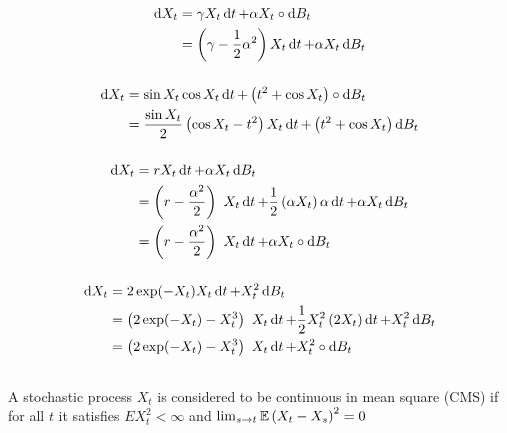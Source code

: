 \documentclass{article}
\begin{document}
        \subsubsection{}
        \begin{align*}
          \mathop{\mathrm{d} X_t }
          &=\gamma X_t\mathop{\mathrm{d} t }+\alpha X_t\circ\mathop{\mathrm{d} B_t }\\
          &=\left({\gamma-\frac{1}{2}\alpha^2}\right) X_t\mathop{\mathrm{d} t }+\alpha X_t\mathop{\mathrm{d} B_t }
          \end{align*}
        \subsubsection{}
        \begin{align*}
          \mathop{\mathrm{d} X_t }
          &=\sin X_t \cos X_t \mathop{\mathrm{d} t }+\left({t^2+\cos X_t}\right)\circ\mathop{\mathrm{d} B_t }\\
          &=\frac{\sin X_t}{2}\left({\cos X_t-t^2}\right) X_t\mathop{\mathrm{d} t }+\left({t^2+\cos X_t}\right)\mathop{\mathrm{d} B_t }
          \end{align*}
        \subsubsection{}
        \begin{align*}
          \mathop{\mathrm{d} X_t }
          &=r X_t\mathop{\mathrm{d} t }+\alpha X_t\mathop{\mathrm{d} B_t }\\
          &=\left({r-\frac{\alpha^2}{2}}\right)\ X_t\mathop{\mathrm{d} t } + \frac{1}{2}\left({\alpha X_t}\right)\alpha\mathop{\mathrm{d} t } +\alpha X_t\mathop{\mathrm{d} B_t }\\
          &=\left({r-\frac{\alpha^2}{2}}\right)\ X_t\mathop{\mathrm{d} t } + \alpha X_t\circ\mathop{\mathrm{d} B_t }
          \end{align*}
        \subsubsection{}

        \begin{align*}
          \mathop{\mathrm{d} X_t }
          &=2\exp(-X_t)X_t\mathop{\mathrm{d} t }+X_t^2\mathop{\mathrm{d} B_t }\\
          &=\left({2\exp(-X_t)-X_t^3}\right)\ X_t\mathop{\mathrm{d} t } + \frac{1}{2}X_t^2\left({2X_t}\right)\mathop{\mathrm{d} t } +X_t^2\mathop{\mathrm{d} B_t }\\
          &=\left({2\exp(-X_t)-X_t^3}\right)\ X_t\mathop{\mathrm{d} t }+ X_t^2\circ\mathop{\mathrm{d} B_t }
        \end{align*}
        \subsection{}

        A stochastic process \(X_t\) is considered to be continuous in mean square (CMS) if for all \(t\) it satisfies \(E X_t^2<\infty\) and \(\lim_{s\rightarrow t}\operatorname{\mathbb{E}}\left({X_t-X_s}\right)^2=0\)
\end{document}
